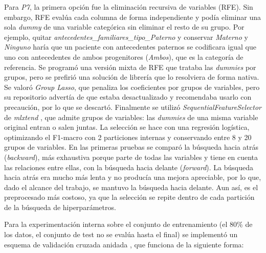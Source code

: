 \documentclass[journal,onecolumn]{IEEEtran}
\begin{document}
Para \textit{P7}, la primera opción fue la eliminación recursiva de variables (RFE). Sin embargo, RFE evalúa cada columna de forma independiente y podía eliminar una sola \textit{dummy} de una variable categórica sin eliminar el resto de su grupo. Por ejemplo, quitar \textit{antecedentes\_familiares\_tipo\_Paterno} y conservar \textit{Materno} y \textit{Ninguno} haría que un paciente con antecedentes paternos se codificara igual que uno con antecedentes de ambos progenitores (\textit{Ambos}), que es la categoría de referencia. Se programó una versión mixta de RFE que trataba las \textit{dummies} por grupos, pero se prefirió una solución de librería que lo resolviera de forma nativa. Se valoró \textit{Group Lasso}, que penaliza los coeficientes por grupos de variables, pero su repositorio advertía de que estaba desactualizado y recomendaba usarlo con precaución, por lo que se descartó. Finalmente se utilizó \textit{SequentialFeatureSelector} de \textit{mlxtend} \cite{raschka2018mlxtend}, que admite grupos de variables: las \textit{dummies} de una misma variable original entran o salen juntas. La selección se hace con una regresión logística, optimizando el F1-macro con 2 particiones internas y conservando entre 8 y 20 grupos de variables. En las primeras pruebas se comparó la búsqueda hacia atrás (\textit{backward}), más exhaustiva porque parte de todas las variables y tiene en cuenta las relaciones entre ellas, con la búsqueda hacia delante (\textit{forward}). La búsqueda hacia atrás era mucho más lenta y no producía una mejora apreciable, por lo que, dado el alcance del trabajo, se mantuvo la búsqueda hacia delante. Aun así, es el preprocesado más costoso, ya que la selección se repite dentro de cada partición de la búsqueda de hiperparámetros.

Para la experimentación interna sobre el conjunto de entrenamiento (el 80\% de los datos, el conjunto de test no se evalúa hasta el final) se implementó un esquema de validación cruzada anidada \cite{varma2006bias,cawley2010overfitting}, que funciona de la siguiente forma:
\end{document}
